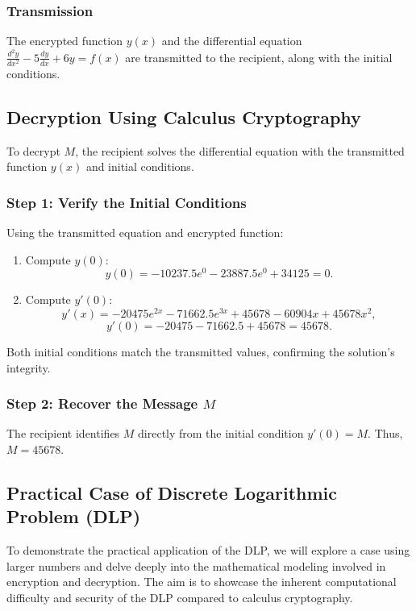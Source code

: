 \documentclass[12pt]{article}
\begin{document}
\subsubsection*{Transmission}
The encrypted function \( y(x) \) and the differential equation \( \frac{d^2y}{dx^2} - 5\frac{dy}{dx} + 6y = f(x) \) are transmitted to the recipient, along with the initial conditions.

\subsection*{Decryption Using Calculus Cryptography}

To decrypt \( M \), the recipient solves the differential equation with the transmitted function \( y(x) \) and initial conditions.

\subsubsection*{Step 1: Verify the Initial Conditions}

Using the transmitted equation and encrypted function:
\begin{enumerate}
    \item Compute \( y(0) \):
    \[
    y(0) = -10237.5e^0 - 23887.5e^0 + 34125 = 0.
    \]

    \item Compute \( y'(0) \):
    \[
    y'(x) = -20475e^{2x} - 71662.5e^{3x} + 45678 - 60904x + 45678x^2,
    \]
    \[
    y'(0) = -20475 - 71662.5 + 45678 = 45678.
    \]
\end{enumerate}

Both initial conditions match the transmitted values, confirming the solution's integrity.

\subsubsection*{Step 2: Recover the Message \( M \)}
The recipient identifies \( M \) directly from the initial condition \( y'(0) = M \). Thus, \( M = 45678 \).






\subsection*{Practical Case of Discrete Logarithmic Problem (DLP)}

To demonstrate the practical application of the DLP, we will explore a case using larger numbers and delve deeply into the mathematical modeling involved in encryption and decryption. The aim is to showcase the inherent computational difficulty and security of the DLP compared to calculus cryptography.
\end{document}
